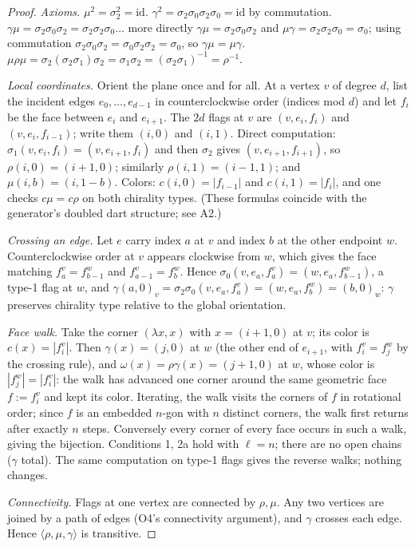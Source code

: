 \documentclass[11pt]{article}
\theoremstyle{definition}
\begin{document}
\begin{proof}
\emph{Axioms.} $\mu^2 = \sigma_2^2 = \mathrm{id}$. $\gamma^2 =
\sigma_2\sigma_0\sigma_2\sigma_0 = \mathrm{id}$ by commutation. $\gamma\mu =
\sigma_2\sigma_0\sigma_2 = \sigma_2\sigma_2\sigma_0\ldots$ more directly $\gamma\mu =
\sigma_2\sigma_0\sigma_2$ and $\mu\gamma = \sigma_2\sigma_2\sigma_0 = \sigma_0$; using
commutation $\sigma_2\sigma_0\sigma_2 = \sigma_0\sigma_2\sigma_2 = \sigma_0$, so
$\gamma\mu = \mu\gamma$. $\mu\rho\mu = \sigma_2(\sigma_2\sigma_1)\sigma_2 =
\sigma_1\sigma_2 = (\sigma_2\sigma_1)^{-1} = \rho^{-1}$.

\emph{Local coordinates.} Orient the plane once and for all. At a vertex $v$ of degree
$d$, list the incident edges $e_0, \dots, e_{d-1}$ in counterclockwise order (indices mod
$d$) and let $f_i$ be the face between $e_i$ and $e_{i+1}$. The $2d$ flags at $v$ are
$(v, e_i, f_i)$ and $(v, e_i, f_{i-1})$; write them $(i,0)$ and $(i,1)$. Direct
computation: $\sigma_1(v,e_i,f_i) = (v,e_{i+1},f_i)$ and then $\sigma_2$ gives
$(v,e_{i+1},f_{i+1})$, so $\rho(i,0) = (i{+}1,0)$; similarly $\rho(i,1) = (i{-}1,1)$;
and $\mu(i,b) = (i,1{-}b)$. Colors: $c(i,0) = |f_{i-1}|$ and $c(i,1) = |f_i|$, and one
checks $c\mu = c\rho$ on both chirality types. (These formulas coincide with the
generator's doubled dart structure; see A2.)

\emph{Crossing an edge.} Let $e$ carry index $a$ at $v$ and index $b$ at the other
endpoint $w$. Counterclockwise order at $v$ appears clockwise from $w$, which gives the
face matching $f^v_a = f^w_{b-1}$ and $f^v_{a-1} = f^w_b$. Hence
$\sigma_0(v,e_a,f^v_a) = (w,e_a,f^w_{b-1})$, a type-1 flag at $w$, and
$\gamma(a,0)_v = \sigma_2\sigma_0(v,e_a,f^v_a) = (w, e_a, f^w_b) = (b,0)_w$: $\gamma$
preserves chirality type relative to the global orientation.

\emph{Face walk.} Take the corner $(\lambda x, x)$ with $x = (i{+}1,0)$ at $v$; its color
is $c(x) = |f^v_i|$. Then $\gamma(x) = (j,0)$ at $w$ (the other end of $e_{i+1}$, with
$f^v_i = f^w_j$ by the crossing rule), and $\omega(x) = \rho\gamma(x) = (j{+}1, 0)$ at
$w$, whose color is $|f^w_j| = |f^v_i|$: the walk has advanced one corner around the same
geometric face $f := f^v_i$ and kept its color. Iterating, the walk visits the corners of
$f$ in rotational order; since $f$ is an embedded $n$-gon with $n$ distinct corners, the
walk first returns after exactly $n$ steps. Conversely every corner of every face occurs
in such a walk, giving the bijection. Conditions 1, 2a hold with $\ell = n$; there are no
open chains ($\gamma$ total). The same computation on type-1 flags gives the reverse
walks; nothing changes.

\emph{Connectivity.} Flags at one vertex are connected by $\rho, \mu$. Any two vertices
are joined by a path of edges (O4's connectivity argument), and $\gamma$ crosses each
edge. Hence $\langle \rho, \mu, \gamma\rangle$ is transitive.
\end{proof}
\end{document}
